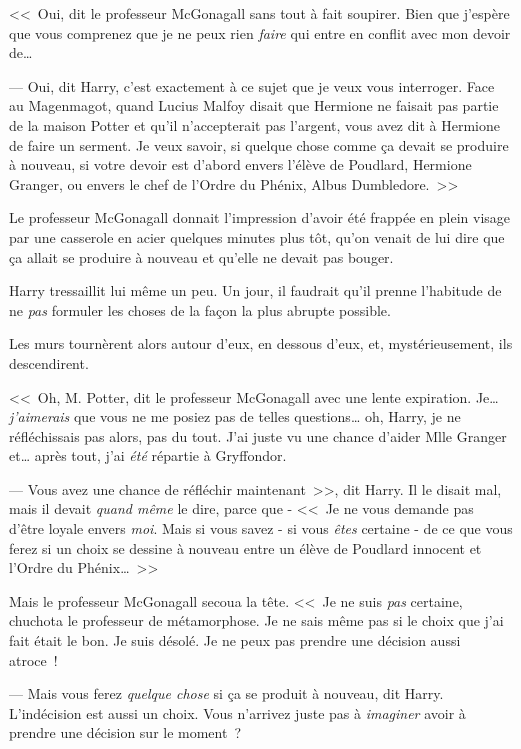 <<~Oui, dit le professeur McGonagall sans tout à fait soupirer. Bien que j'espère que vous comprenez que je ne peux rien \emph{faire} qui entre en conflit avec mon devoir de…

--- Oui, dit Harry, c'est exactement à ce sujet que je veux vous interroger. Face au Magenmagot, quand Lucius Malfoy disait que Hermione ne faisait pas partie de la maison Potter et qu'il n'accepterait pas l'argent, vous avez dit à Hermione de faire un serment. Je veux savoir, si quelque chose comme ça devait se produire à nouveau, si votre devoir est d'abord envers l'élève de Poudlard, Hermione Granger, ou envers le chef de l'Ordre du Phénix, Albus Dumbledore.~>>

Le professeur McGonagall donnait l'impression d'avoir été frappée en plein visage par une casserole en acier quelques minutes plus tôt, qu'on venait de lui dire que ça allait se produire à nouveau et qu'elle ne devait pas bouger.

Harry tressaillit lui même un peu. Un jour, il faudrait qu'il prenne l'habitude de ne \emph{pas} formuler les choses de la façon la plus abrupte possible.

Les murs tournèrent alors autour d'eux, en dessous d'eux, et, mystérieusement, ils descendirent.

<<~Oh, M. Potter, dit le professeur McGonagall avec une lente expiration. Je… \emph{j'aimerais} que vous ne me posiez pas de telles questions… oh, Harry, je ne réfléchissais pas alors, pas du tout. J'ai juste vu une chance d'aider Mlle Granger et… après tout, j'ai \emph{été} répartie à Gryffondor.

--- Vous avez une chance de réfléchir maintenant~>>, dit Harry. Il le disait mal, mais il devait \emph{quand même} le dire, parce que - <<~Je ne vous demande pas d'être loyale envers \emph{moi}. Mais si vous savez - si vous \emph{êtes} certaine - de ce que vous ferez si un choix se dessine à nouveau entre un élève de Poudlard innocent et l'Ordre du Phénix…~>>

Mais le professeur McGonagall secoua la tête. <<~Je ne suis \emph{pas} certaine, chuchota le professeur de métamorphose. Je ne sais même pas si le choix que j'ai fait était le bon. Je suis désolé. Je ne peux pas prendre une décision aussi atroce~!

--- Mais vous ferez \emph{quelque chose} si ça se produit à nouveau, dit Harry. L'indécision est aussi un choix. Vous n'arrivez juste pas à \emph{imaginer} avoir à prendre une décision sur le moment~?

